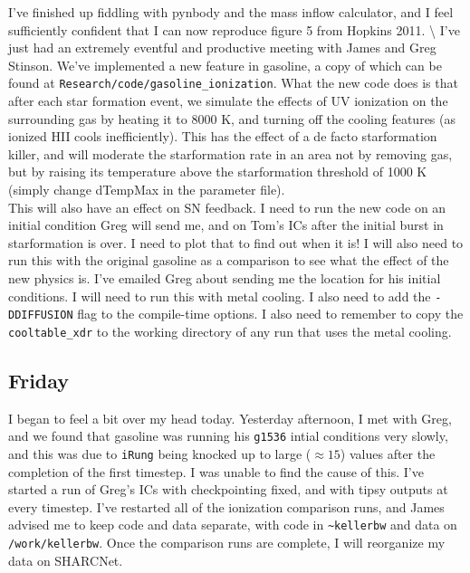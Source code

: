\documentclass[11pt,letterpaper]{article}
\begin{document}
I've finished up fiddling with pynbody and the mass inflow calculator,
and I feel sufficiently confident that I can now reproduce figure 5 from
Hopkins 2011. \textbackslash{} I've just had an extremely eventful and
productive meeting with James and Greg Stinson. We've implemented a new
feature in gasoline, a copy of which can be found at
\verb!Research/code/gasoline_ionization!. What the new code does is that
after each star formation event, we simulate the effects of UV
ionization on the surrounding gas by heating it to 8000 K, and turning
off the cooling features (as ionized HII cools inefficiently). This has
the effect of a de facto starformation killer, and will moderate the
starformation rate in an area not by removing gas, but by raising its
temperature above the starformation threshold of 1000 K (simply change
dTempMax in the parameter file).\\This will also have an effect on SN
feedback. I need to run the new code on an initial condition Greg will
send me, and on Tom's ICs after the initial burst in starformation is
over. I need to plot that to find out when it is! I will also need to
run this with the original gasoline as a comparison to see what the
effect of the new physics is. I've emailed Greg about sending me the
location for his initial conditions. I will need to run this with metal
cooling. I also need to add the \verb!-DDIFFUSION! flag to the
compile-time options. I also need to remember to copy the
\verb!cooltable_xdr! to the working directory of any run that uses the
metal cooling.

\subsection{Friday}

I began to feel a bit over my head today. Yesterday afternoon, I met
with Greg, and we found that gasoline was running his \verb!g1536!
intial conditions very slowly, and this was due to \verb!iRung! being
knocked up to large ($\approx15$) values after the completion of the
first timestep. I was unable to find the cause of this. I've started a
run of Greg's ICs with checkpointing fixed, and with tipsy outputs at
every timestep. I've restarted all of the ionization comparison runs,
and James advised me to keep code and data separate, with code in
\verb!~kellerbw! and data on \verb!/work/kellerbw!. Once the comparison
runs are complete, I will reorganize my data on SHARCNet.
\end{document}
